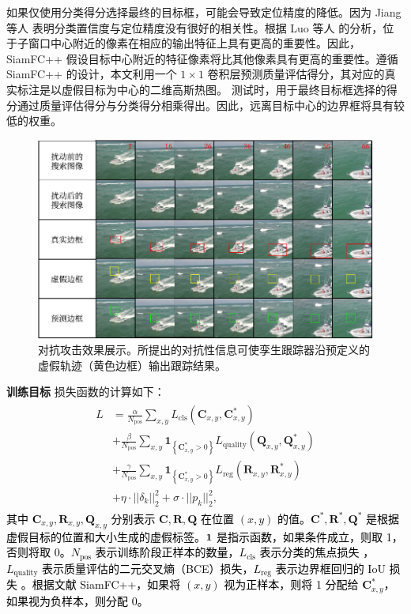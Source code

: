 如果仅使用分类得分选择最终的目标框，可能会导致定位精度的降低。因为 Jiang 等人 \cite{IoU-Net} 表明分类置信度与定位精度没有很好的相关性。根据 Luo 等人 \cite{ERF} 的分析，位于子窗口中心附近的像素在相应的输出特征上具有更高的重要性。因此，SiamFC++ 假设目标中心附近的特征像素将比其他像素具有更高的重要性。遵循 SiamFC++ 的设计，本文利用一个 $1 \times 1$ 卷积层预测质量评估得分，其对应的真实标注是以虚假目标为中心的二维高斯热图。
测试时，用于最终目标框选择的得分通过质量评估得分与分类得分相乘得出。因此，远离目标中心的边界框将具有较低的权重。

\begin{figure}[t]
\centering
\includegraphics[width=1.0\textwidth]{Img/attack/vis_v5.pdf}
\caption{对抗攻击效果展示。所提出的对抗性信息可使孪生跟踪器沿预定义的虚假轨迹（黄色边框）输出跟踪结果。}
\label{fig:attack_vis}
\end{figure}

\textbf{训练目标} 损失函数的计算如下：
\begin{equation}
\begin{array}{l}
\begin{aligned}
L&=\frac{\alpha}{N_{\mathrm{pos}}} \sum_{x, y} L_{\mathrm{cls}}\left(\textbf{C}_{x, y}, \textbf{C}_{x, y}^{*}\right) \\
&+\frac{\beta}{N_{\mathrm{pos}}} \sum_{x, y} \textbf{1}_{\left\{\textbf{C}_{x, y}^{*}>0\right\}} L_{\mathrm{quality}}\left(\textbf{Q}_{x, y}, \textbf{Q}_{x, y}^{*}\right) \\
&+\frac{\gamma}{N_{\mathrm{pos}}} \sum_{x, y} \textbf{1}_{\left\{\textbf{C}_{x, y}^{*}>0\right\}} L_{\mathrm{reg}}\left(\textbf{R}_{x, y}, \textbf{R}_{x, y}^{*}\right) \\
&+\eta \cdot ||\delta_k||_2^2 +  \sigma \cdot ||p_k||^2_2,
\end{aligned}
\end{array}
\label{eq:loss}
\end{equation}
\textcolor{black} %
{其中 $\textbf{C}_{x, y}, \textbf{R}_{x, y}, \textbf{Q}_{x, y}$ 分别表示 $\textbf{C}, \textbf{R}, \textbf{Q}$ 在位置 $(x, y)$ 的值。$\textbf{C}^*, \textbf{R}^*, \textbf{Q}^*$ 是根据虚假目标的位置和大小生成的虚假标签。$\textbf 1$ 是指示函数，如果条件成立，则取 1，否则将取 0。$N_{\mathrm{pos}}$ 表示训练阶段正样本的数量，$L_{\mathrm{cls}}$ 表示分类的焦点损失 \cite{focal}，$L_{\mathrm{quality}}$ 表示质量评估的二元交叉熵（BCE）损失，$L_{\mathrm{reg}}$ 表示边界框回归的 IoU 损失 \cite{iou-loss}。根据文献 SiamFC++，如果将 $(x, y)$ 视为正样本，则将 1 分配给 $\textbf{C}_{x, y}^{*}$，如果视为负样本，则分配 0。}

